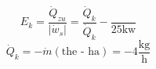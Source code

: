 

\item[d)] 
    \[
    E_k = \frac{\dot{Q}_{zu}}{\left| \dot{w}_s \right|} = \frac{\dot{Q}_k}{\dot{Q}_k} - \frac{}{25 \text{kw}}
    \]
    \[
    \dot{Q}_k = -\dot{m} (\text{the - ha}) = -4 \frac{\text{kg}}{\text{h}}
    \]
